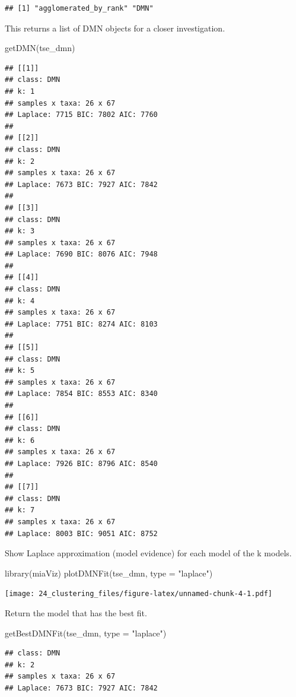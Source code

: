 \documentclass[
]{book}
\newenvironment{Shaded}{\begin{snugshade}}{\end{snugshade}}
\newcommand{\AttributeTok}[1]{\textcolor[rgb]{0.77,0.63,0.00}{#1}}
\newcommand{\FunctionTok}[1]{\textcolor[rgb]{0.00,0.00,0.00}{#1}}
\newcommand{\NormalTok}[1]{#1}
\newcommand{\StringTok}[1]{\textcolor[rgb]{0.31,0.60,0.02}{#1}}
\begin{document}
\begin{verbatim}
## [1] "agglomerated_by_rank" "DMN"
\end{verbatim}

This returns a list of DMN objects for a closer investigation.

\begin{Shaded}
\begin{Highlighting}[]
\FunctionTok{getDMN}\NormalTok{(tse\_dmn)}
\end{Highlighting}
\end{Shaded}

\begin{verbatim}
## [[1]]
## class: DMN 
## k: 1 
## samples x taxa: 26 x 67 
## Laplace: 7715 BIC: 7802 AIC: 7760 
## 
## [[2]]
## class: DMN 
## k: 2 
## samples x taxa: 26 x 67 
## Laplace: 7673 BIC: 7927 AIC: 7842 
## 
## [[3]]
## class: DMN 
## k: 3 
## samples x taxa: 26 x 67 
## Laplace: 7690 BIC: 8076 AIC: 7948 
## 
## [[4]]
## class: DMN 
## k: 4 
## samples x taxa: 26 x 67 
## Laplace: 7751 BIC: 8274 AIC: 8103 
## 
## [[5]]
## class: DMN 
## k: 5 
## samples x taxa: 26 x 67 
## Laplace: 7854 BIC: 8553 AIC: 8340 
## 
## [[6]]
## class: DMN 
## k: 6 
## samples x taxa: 26 x 67 
## Laplace: 7926 BIC: 8796 AIC: 8540 
## 
## [[7]]
## class: DMN 
## k: 7 
## samples x taxa: 26 x 67 
## Laplace: 8003 BIC: 9051 AIC: 8752
\end{verbatim}

Show Laplace approximation (model evidence) for each model of the k models.

\begin{Shaded}
\begin{Highlighting}[]
\FunctionTok{library}\NormalTok{(miaViz)}
\FunctionTok{plotDMNFit}\NormalTok{(tse\_dmn, }\AttributeTok{type =} \StringTok{"laplace"}\NormalTok{)}
\end{Highlighting}
\end{Shaded}

\texttt{[image: 24\_clustering\_files/figure-latex/unnamed-chunk-4-1.pdf]}

Return the model that has the best fit.

\begin{Shaded}
\begin{Highlighting}[]
\FunctionTok{getBestDMNFit}\NormalTok{(tse\_dmn, }\AttributeTok{type =} \StringTok{"laplace"}\NormalTok{)}
\end{Highlighting}
\end{Shaded}

\begin{verbatim}
## class: DMN 
## k: 2 
## samples x taxa: 26 x 67 
## Laplace: 7673 BIC: 7927 AIC: 7842
\end{verbatim}
\end{document}

